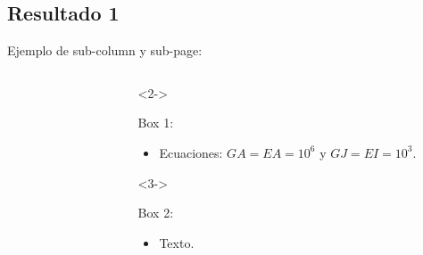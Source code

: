 \documentclass[
  aspectratio=169,
]{beamer}
\begin{document}
\begin{small}
\subsection[Resultado 1 Abv]{Resultado 1}
\begin{frame}[t]{Ejemplo de sub-column y sub-page:}
	\begin{columns}[T,onlytextwidth]
		\begin{column}{.58\textwidth}
			\begin{minipage}{\textwidth}
				\begin{figure}[htbp]
				\label{fig:RN:RA:Ilusxy}
				\label{fig:RN:RA:Ilusyz}
				\end{figure}
					\begin{figure}[htbp]
					
					\def\svgwidth{35mm}
					
				\end{figure}
		\end{minipage}  
		\end{column}
		\begin{column}{.4\textwidth}
			\begin{onlyenv}<2->
				\begin{minipage}{\textwidth}
					\vspace{-1cm}
					\begin{block}{Box 1:}
						\begin{itemize}
							\item Ecuaciones: $GA= EA=10^6$ y $GJ = EI =10^3$.  

						\end{itemize}	 
					\end{block}
				\end{minipage}
			\end{onlyenv}
			\begin{onlyenv}<3->
				\begin{minipage}{\textwidth}
					\begin{block}{Box 2:}
						\begin{itemize}
							\item Texto.
						\end{itemize}	 
					\end{block}
				\end{minipage}
			\end{onlyenv}
		\end{column}
	\end{columns}
\end{frame}

\end{small}
\end{document}
